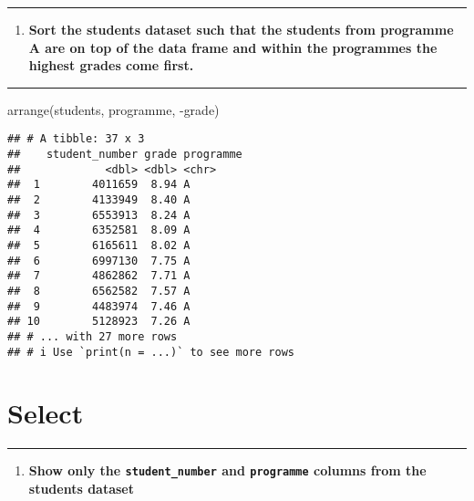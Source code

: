 \documentclass[
]{article}
\newenvironment{Shaded}{\begin{snugshade}}{\end{snugshade}}
\newcommand{\FunctionTok}[1]{\textcolor[rgb]{0.00,0.00,0.00}{#1}}
\newcommand{\NormalTok}[1]{#1}
\newcommand{\SpecialCharTok}[1]{\textcolor[rgb]{0.00,0.00,0.00}{#1}}
\providecommand{\tightlist}{%
  \setlength{\itemsep}{0pt}\setlength{\parskip}{0pt}}
\begin{document}
\begin{center}\rule{0.5\linewidth}{0.5pt}\end{center}

\begin{enumerate}
\def\labelenumi{\arabic{enumi}.}
\setcounter{enumi}{12}
\tightlist
\item
  \textbf{Sort the students dataset such that the students from
  programme A are on top of the data frame and within the programmes the
  highest grades come first.}
\end{enumerate}

\begin{center}\rule{0.5\linewidth}{0.5pt}\end{center}

\begin{Shaded}
\begin{Highlighting}[]
\FunctionTok{arrange}\NormalTok{(students, programme, }\SpecialCharTok{{-}}\NormalTok{grade)}
\end{Highlighting}
\end{Shaded}

\begin{verbatim}
## # A tibble: 37 x 3
##    student_number grade programme
##             <dbl> <dbl> <chr>    
##  1        4011659  8.94 A        
##  2        4133949  8.40 A        
##  3        6553913  8.24 A        
##  4        6352581  8.09 A        
##  5        6165611  8.02 A        
##  6        6997130  7.75 A        
##  7        4862862  7.71 A        
##  8        6562582  7.57 A        
##  9        4483974  7.46 A        
## 10        5128923  7.26 A        
## # ... with 27 more rows
## # i Use `print(n = ...)` to see more rows
\end{verbatim}

\hypertarget{select}{%
\section{Select}\label{select}}

\begin{center}\rule{0.5\linewidth}{0.5pt}\end{center}

\begin{enumerate}
\def\labelenumi{\arabic{enumi}.}
\setcounter{enumi}{13}
\tightlist
\item
  \textbf{Show only the \texttt{student\_number} and \texttt{programme}
  columns from the students dataset}
\end{enumerate}
\end{document}
